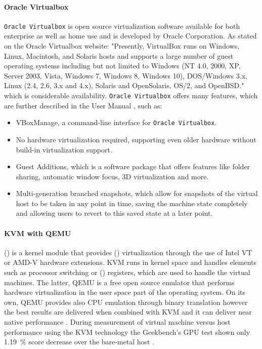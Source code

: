 \paragraph{Oracle Virtualbox}
\texttt{Oracle Virtualbox} is open source virtualization software available for both enterprise as well as home use and is developed by Oracle Corporation. As stated on the Oracle Virtualbox website: "Presently, VirtualBox runs on Windows, Linux, Macintosh, and Solaris hosts and supports a large number of guest operating systems including but not limited to Windows (NT 4.0, 2000, XP, Server 2003, Vista, Windows 7, Windows 8, Windows 10), DOS/Windows 3.x, Linux (2.4, 2.6, 3.x and 4.x), Solaris and OpenSolaris, OS/2, and OpenBSD." \cite{oraclehome} which is considerable availability. \texttt{Oracle Virtualbox} offers many features, which are further described in the User Manual \cite{oracledatasheet}, such as:
\begin{itemize}
	\item VBoxManage, a command-line interface for \texttt{Oracle Virtualbox}.
	\item No hardware virtualization required, supporting even older hardware without build-in virtualization support. 
	\item Guest Additions, which is a software package that offers features like folder sharing, automatic window focus, 3D virtualization and more.
	\item Multi-generation branched snapshots, which allow for snapshots of the virtual host to be taken in any point in time, saving the machine state completely and allowing users to revert to this saved state at a later point.
\end{itemize}
\paragraph{KVM with QEMU}
 () is a kernel module that provides  () virtualization through the use of Intel VT or AMD-V hardware extensions. KVM runs in kernel space and handles elements such as processor switching or  () registers, which are used to handle the virtual machines. The latter, QEMU is a free open source emulator that performs hardware virtualization in the user space part of the operating system. On its own, QEMU provides also CPU emulation through binary translation however the best results are delivered when combined with KVM and it can deliver near native performance \cite{kvmspeed}. During measurement of virtual machine versus host performance using the KVM technology the Geekbench’s GPU test shown only \SI{1.19}{\percent} score decrease over the bare-metal host \cite{kvmbenchmark}.


